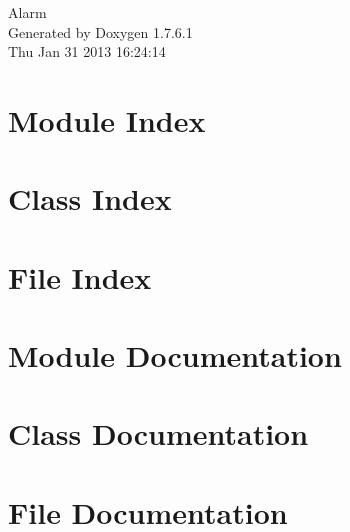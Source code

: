 \documentclass[a4paper]{book}
\begin{document}
\hypersetup{pageanchor=false,citecolor=blue}
\begin{titlepage}
\vspace*{7cm}
\begin{center}
{\Large \-Alarm }\\
\vspace*{1cm}
{\large \-Generated by Doxygen 1.7.6.1}\\
\vspace*{0.5cm}
{\small Thu Jan 31 2013 16:24:14}\\
\end{center}
\end{titlepage}
\clearemptydoublepage
{}
\tableofcontents
\clearemptydoublepage
{}
\hypersetup{pageanchor=true,citecolor=blue}
\chapter{\-Module \-Index}

\chapter{\-Class \-Index}

\chapter{\-File \-Index}

\chapter{\-Module \-Documentation}

\chapter{\-Class \-Documentation}















\chapter{\-File \-Documentation}


















\printindex
\end{document}
